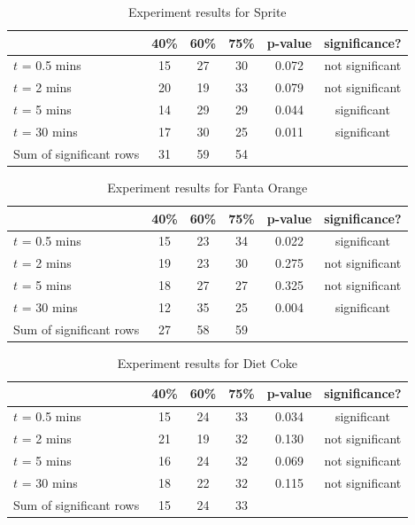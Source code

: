 \documentclass[oneside,12pt]{report}
\begin{document}
\begin{table}[ h]
\centering
\begin{tabular}{ l || c|c|c||c|c }
  &40\% &60\% & 75\% &p-value &significance? \\
\hline  
$t$ = 0.5 mins & 15 & 27 & 30&0.072&not significant\\ 
\hline  
$t$ = 2 mins & 20 & 19 & 33&0.079&not significant\\ 
\hline  
$t$ = 5 mins & 14 & 29 & 29&0.044&significant\\ 
\hline  
$t$ = 30 mins & 17 & 30 & 25&0.011&significant\\ 
\hline  
Sum of significant rows & 31 & 59 & 54 & & \\ 
\hline     

 \end{tabular}
\caption{Experiment results for Sprite}
\end{table}

\begin{table}[ h]
\centering
\begin{tabular}{ l || c|c|c||c|c }
  &40\% &60\% & 75\% &p-value &significance? \\
\hline  
$t$ = 0.5 mins & 15 & 23 & 34&0.022&significant\\ 
\hline  
$t$ = 2 mins & 19 & 23 & 30&0.275&not significant\\ 
\hline  
$t$ = 5 mins & 18 & 27 & 27&0.325&not significant\\ 
\hline  
$t$ = 30 mins & 12 & 35 & 25&0.004&significant\\ 
\hline     
Sum of significant rows & 27 & 58 & 59 & & \\ 
\hline     
 \end{tabular}
\caption{Experiment results for Fanta Orange}
\end{table}

\begin{table}[ h]
\centering
\begin{tabular}{ l || c|c|c||c|c }
  &40\% &60\% & 75\% &p-value &significance? \\
\hline  
$t$ = 0.5 mins & 15 & 24 & 33&0.034&significant\\ 
\hline  
$t$ = 2 mins & 21& 19 & 32&0.130 &not significant\\ 
\hline  
$t$ = 5 mins & 16 & 24 & 32&0.069&not significant\\ 
\hline  
$t$ = 30 mins & 18 & 22& 32&0.115&not significant\\ 
\hline  
Sum of significant rows & 15 & 24 & 33 & & \\ 
\hline     
 \end{tabular}
\caption{Experiment results for Diet Coke}
\end{table}
\end{document}
